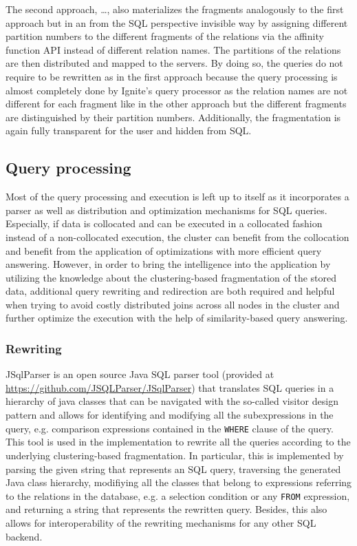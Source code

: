 The second approach, \dots, also materializes the fragments analogously to the first approach but in an from the SQL perspective invisible way by assigning
different partition numbers to the different fragments of the relations via the affinity function API instead of different relation names. The partitions of 
the relations are then distributed and mapped to the servers. By doing so, the queries do not require to be rewritten as in the first approach because the 
query processing is almost completely done by Ignite's query processor as the relation names are not different for each fragment like in the other approach 
but the different fragments are distinguished by their partition numbers. Additionally, the fragmentation is again fully transparent for the user and hidden
from SQL.



\subsection{Query processing}
\label{sec:impl_qpro}

Most of the query processing and execution is left up to  itself as it incorporates a parser as well as distribution and optimization
mechanisms for SQL queries. Especially, if data is collocated and can be executed in a collocated fashion instead of a non-collocated execution, the cluster 
can benefit from the collocation and benefit from the application of optimizations with more efficient query answering. However, in order to bring the
intelligence into the application by utilizing the knowledge about the clustering-based fragmentation of the stored data, additional query rewriting and
redirection are both required and helpful when trying to avoid costly distributed joins across all nodes in the cluster and further optimize the execution 
with the help of similarity-based query answering.

\subsubsection{Rewriting}
\label{sec:impl_qpro_rewr}

JSqlParser is an open source Java SQL parser tool (provided at \url{https://github.com/JSQLParser/JSqlParser}) that translates SQL queries in a hierarchy 
of java classes that can be navigated with the so-called visitor design pattern \cite[pp.~331ff.]{Gamma1994} and allows for identifying and modifying all the
subexpressions in the query, e.g. comparison expressions contained in the \verb!WHERE! clause of the query. This tool is used in the implementation 
to rewrite all the queries according to the underlying clustering-based fragmentation. In particular, this is implemented by parsing the given string that 
represents an SQL query, traversing the generated Java class hierarchy, modifiying all the classes that belong to expressions referring to the relations in
the database, e.g. a selection condition or any \verb!FROM! expression, and returning a string that represents the rewritten query. Besides, this also allows
for interoperability of the rewriting mechanisms for any other SQL backend. 

